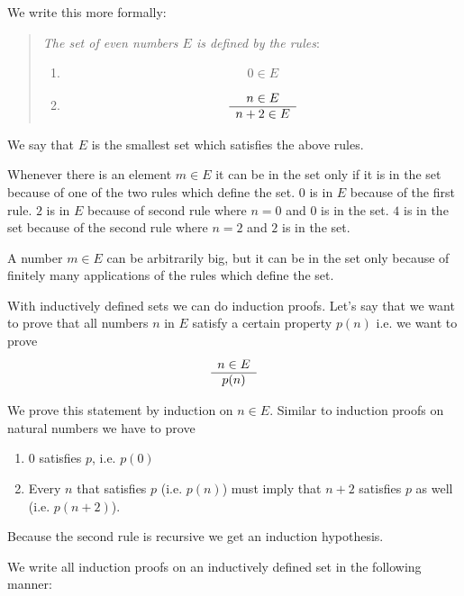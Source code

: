 We write this more formally:

\begin{quote}

\emph{The set of even numbers $E$ is defined by the rules}:
    \begin{enumerate}
    \item $$ 0 \in E$$

    \item
        $$
        \begin{array}{c} n \in E \\ \hline n+2 \in E\end{array}
        $$
    \end{enumerate}
\end{quote}

We say that $E$ is the smallest set which satisfies the above rules.

Whenever there is an element $m \in E$ it can be in the set only if it is in the
set because of one of the two rules which define the set. $0$ is in $E$ because
of the first rule. $2$ is in $E$ because of second rule where $n = 0$ and $0$ is
in the set. $4$ is in the set because of the second rule where $n = 2$ and $2$
is in the set.

A number $m \in E$ can be arbitrarily big, but it can be in the set only because
of finitely many applications of the rules which define the set.

With inductively defined sets we can do induction proofs. Let's say that we want
to prove that all numbers $n$ in $E$ satisfy a certain property $p(n)$ i.e. we
want to prove
$$
\begin{array}{c} n \in E \\ \hline p(n)\end{array}
$$

We prove this statement by induction on $n \in E$. Similar to induction proofs
on natural numbers we have to prove

\begin{enumerate}
\item $0$ satisfies $p$, i.e. $p(0)$

\item Every $n$ that satisfies $p$ (i.e. $p(n)$) must imply that $n+2$ satisfies
$p$ as well (i.e. $p(n+2)$).

\end{enumerate}

Because the second rule is recursive we get an induction hypothesis.

We write all induction proofs on an inductively defined set in the following
manner:


